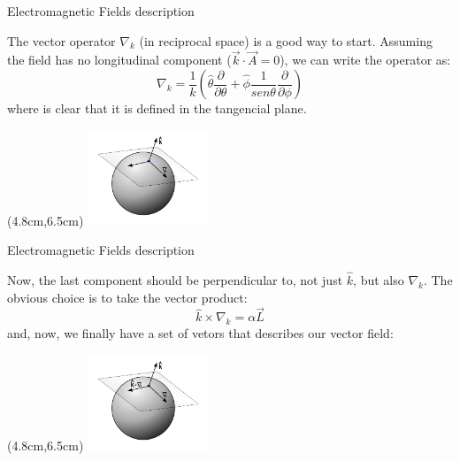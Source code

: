 \documentclass[10pt]{beamer}
\begin{document}

\begin{frame}[fragile]{Electromagnetic Fields description}

The vector operator $\nabla_k$ (in reciprocal space) is a good way to start. Assuming the field has no longitudinal component ($\vec{k} \cdot \vec{A}=0$), we can write the operator as:
      \begin{equation*}
          \nabla_k = \frac{1}{k}\left(\hat{\theta}\frac{\partial}{\partial\theta} + \hat{\phi}\frac{1}{sen\theta}\frac{\partial}{\partial\phi}\right)
      \end{equation*}
where is clear that it is defined in the tangencial plane.
        \begin{textblock*}{3cm}(4.8cm,6.5cm)
            \includegraphics[width=3.6cm]{tangesfkd}
        \end{textblock*}
\end{frame}


\begin{frame}[fragile]{Electromagnetic Fields description}

Now, the last component should be perpendicular to, not just $\hat{k}$, but also $\nabla_k$. The obvious choice is to take the vector product:
      \begin{equation*}
          \hat{k}\times\nabla_k = \alpha \vec{L}
      \end{equation*}
and, now, we finally have a set of vetors that describes our vector field:
        \begin{textblock*}{3cm}(4.8cm,6.5cm)
            \includegraphics[width=3.6cm]{tangesfkdk}
        \end{textblock*}

\end{frame}
\end{document}
